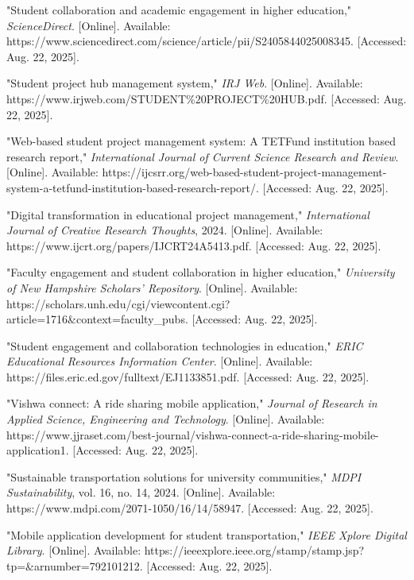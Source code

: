 \documentclass[conference]{IEEEtran}
\begin{document}
\begin{thebibliography}{99}
 "Student collaboration and academic engagement in higher education," \emph{ScienceDirect}. [Online]. Available: https://www.sciencedirect.com/science/article/pii/S2405844025008345. [Accessed: Aug. 22, 2025].

 "Student project hub management system," \emph{IRJ Web}. [Online]. Available: https://www.irjweb.com/STUDENT\%20PROJECT\%20HUB.pdf. [Accessed: Aug. 22, 2025].

 "Web-based student project management system: A TETFund institution based research report," \emph{International Journal of Current Science Research and Review}. [Online]. Available: https://ijcsrr.org/web-based-student-project-management-system-a-tetfund-institution-based-research-report/. [Accessed: Aug. 22, 2025].

 "Digital transformation in educational project management," \emph{International Journal of Creative Research Thoughts}, 2024. [Online]. Available: https://www.ijcrt.org/papers/IJCRT24A5413.pdf. [Accessed: Aug. 22, 2025].

 "Faculty engagement and student collaboration in higher education," \emph{University of New Hampshire Scholars' Repository}. [Online]. Available: https://scholars.unh.edu/cgi/viewcontent.cgi?article=1716\&context=faculty\_pubs. [Accessed: Aug. 22, 2025].

 "Student engagement and collaboration technologies in education," \emph{ERIC Educational Resources Information Center}. [Online]. Available: https://files.eric.ed.gov/fulltext/EJ1133851.pdf. [Accessed: Aug. 22, 2025].

 "Vishwa connect: A ride sharing mobile application," \emph{Journal of Research in Applied Science, Engineering and Technology}. [Online]. Available: https://www.jjraset.com/best-journal/vishwa-connect-a-ride-sharing-mobile-application1. [Accessed: Aug. 22, 2025].

 "Sustainable transportation solutions for university communities," \emph{MDPI Sustainability}, vol. 16, no. 14, 2024. [Online]. Available: https://www.mdpi.com/2071-1050/16/14/58947. [Accessed: Aug. 22, 2025].

 "Mobile application development for student transportation," \emph{IEEE Xplore Digital Library}. [Online]. Available: https://ieeexplore.ieee.org/stamp/stamp.jsp?tp=\&arnumber=792101212. [Accessed: Aug. 22, 2025].


\end{thebibliography}
\end{document}
